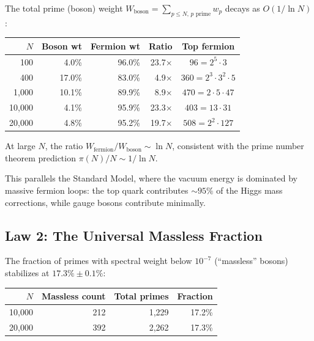 \documentclass[11pt,a4paper]{article}
\begin{document}
\begin{observation}
\label{obs:decay}
The total prime (boson) weight
$W_{\text{boson}} = \sum_{p \leq N,\, p\text{ prime}} w_p$
decays as $O(1/\ln N)$:
\begin{center}
\begin{tabular}{@{}rrrrc@{}}
\toprule
$N$ & Boson wt & Fermion wt & Ratio & Top fermion \\
\midrule
100     & 4.0\%  & 96.0\% & 23.7$\times$ & $96 = 2^5 \cdot 3$ \\
400     & 17.0\% & 83.0\% & 4.9$\times$  & $360 = 2^3 \cdot 3^2 \cdot 5$ \\
1{,}000    & 10.1\% & 89.9\% & 8.9$\times$  & $470 = 2 \cdot 5 \cdot 47$ \\
10{,}000   & 4.1\%  & 95.9\% & 23.3$\times$ & $403 = 13 \cdot 31$ \\
20{,}000   & 4.8\%  & 95.2\% & 19.7$\times$ & $508 = 2^2 \cdot 127$ \\
\bottomrule
\end{tabular}
\end{center}
At large $N$, the ratio $W_{\text{fermion}} / W_{\text{boson}} \sim \ln N$,
consistent with the prime number theorem prediction
$\pi(N)/N \sim 1/\ln N$.
\end{observation}

This parallels the Standard Model, where the vacuum energy is dominated
by massive fermion loops: the top quark contributes ${\sim}95\%$ of the
Higgs mass corrections, while gauge bosons contribute minimally.

\subsection{Law 2: The Universal Massless Fraction}

\begin{observation}
\label{obs:massless}
The fraction of primes with spectral weight below $10^{-7}$
(``massless'' bosons) stabilizes at $17.3\% \pm 0.1\%$:
\begin{center}
\begin{tabular}{@{}rrrr@{}}
\toprule
$N$ & Massless count & Total primes & Fraction \\
\midrule
10{,}000 & 212  & 1{,}229  & 17.2\% \\
20{,}000 & 392  & 2{,}262  & 17.3\% \\
\bottomrule
\end{tabular}
\end{center}
\end{observation}
\end{document}
